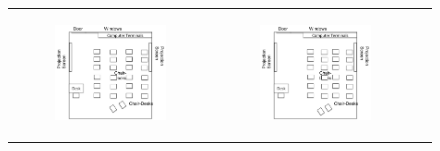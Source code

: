 \documentclass[11pt,letterpaper]{article}
\begin{document}
\begin{figure}
{\begin{tabular}{ccc}
\begin{subfigure}[b]{0.33\textwidth}\includegraphics[width=\textwidth]{figures/classroom-close.pdf}\caption{}\label{fig:classroom-f}\end{subfigure}&
\begin{subfigure}[b]{0.33\textwidth}\includegraphics[width=\textwidth]{figures/classroom-far-away.pdf}\caption{}\label{fig:classroom-e}\end{subfigure}\\

\end{tabular}}
\end{figure}
\end{document}
